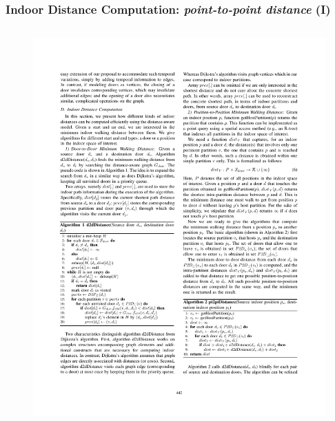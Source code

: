 \begin{frame}
\frametitle{Indoor Distance Computation: \emph{point-to-point distance} (I)}

\begin{columns}[c]

  \begin{figure}[tb]
    \includegraphics[width=\columnwidth]{figures/2-5/2-5-4.pdf}
  \end{figure}



\end{columns}

\end{frame}


